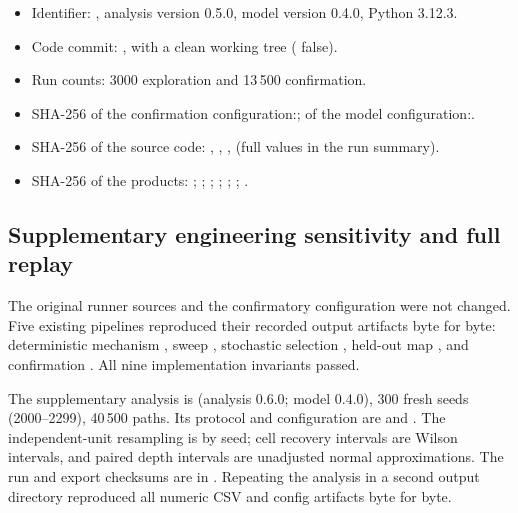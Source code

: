 \begin{itemize}
  \raggedright
  \item Identifier: \code{\RunID}, analysis version 0.5.0, model version 0.4.0, Python 3.12.3.
  \item Code commit: , with a clean working tree ( false).
  \item Run counts: 3000 exploration and 13\,500 confirmation.
  \item SHA-256 of the confirmation configuration:\newline{}; of the model configuration:\newline{}.
  \item SHA-256 of the source code:  ,  ,  ,   (full values in the run summary).
  \item SHA-256 of the products:  ;  ;  ;  ;\newline{} ;\newline{} ;  .
\end{itemize}

\subsection*{Supplementary engineering sensitivity and full replay}

The original runner sources and the confirmatory configuration were not changed. Five existing pipelines reproduced their recorded output artifacts byte for byte: deterministic mechanism , sweep , stochastic selection , held-out map , and confirmation . All nine implementation invariants passed.

The supplementary analysis is  (analysis 0.6.0; model 0.4.0), 300 fresh seeds (2000--2299), 40\,500 paths. Its protocol and configuration are  and . The independent-unit resampling is by seed; cell recovery intervals are Wilson intervals, and paired depth intervals are unadjusted normal approximations. The run and export checksums are in . Repeating the analysis in a second output directory reproduced all numeric CSV and config artifacts byte for byte.

